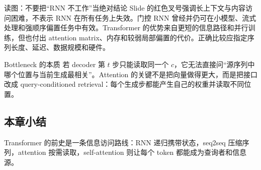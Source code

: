 
\begin{knowledgebox}{读图：不要把“RNN 不工作”当绝对结论}
Slide 的红色叉号强调长上下文与内容访问困难，不表示 RNN 在所有任务上失效。门控 RNN 曾经并仍可在小模型、流式处理和强顺序偏置任务中有效。Transformer 的优势来自更短的信息路径和并行训练，但也付出 attention matrix、内存和较弱局部偏置的代价。正确比较应指定序列长度、延迟、数据规模和硬件。
\end{knowledgebox}

\begin{importantbox}{Bottleneck 的本质}
若 decoder 第 $t$ 步只能读取同一个 $c$，它无法直接问“源序列中哪个位置与当前生成最相关”。Attention 的关键不是把向量做得更大，而是把接口改成 query-conditioned retrieval：每个生成步都能产生自己的权重并读取不同位置。
\end{importantbox}

\subsection{本章小结}

Transformer 的前史是一条信息访问路线：RNN 递归携带状态，seq2seq 压缩序列，attention 按需读取，self-attention 则让每个 token 都能成为查询者和信息源。


